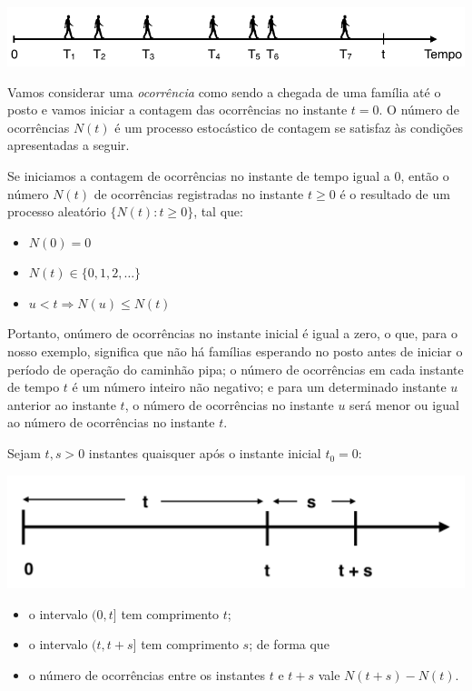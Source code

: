 \documentclass[
]{book}
\providecommand{\tightlist}{%
  \setlength{\itemsep}{0pt}\setlength{\parskip}{0pt}}
\theoremstyle{definition}
\theoremstyle{definition}
\theoremstyle{definition}
\theoremstyle{remark}
\begin{document}
\includegraphics[width=1\linewidth]{img/processo-poisson-tempo}

Vamos considerar uma \emph{ocorrência} como sendo a chegada de uma família até o posto e vamos iniciar a contagem das ocorrências no instante \(t = 0\). O número de ocorrências \(N(t)\) é um processo estocástico de contagem se satisfaz às condições apresentadas a seguir.

Se iniciamos a contagem de ocorrências no instante de tempo igual a 0, então o número \(N(t)\) de ocorrências registradas no instante \(t\geq0\) é o resultado de um processo aleatório \(\{N(t): t \geq 0\}\), tal que:

\begin{itemize}
\tightlist
\item
  \(N(0) = 0\)\\
\item
  \(N(t) \in \{0, 1, 2, \ldots\}\)\\
\item
  \(u < t \Rightarrow N(u) \leq N(t)\)
\end{itemize}

Portanto, onúmero de ocorrências no instante inicial é igual a zero, o que, para o nosso exemplo, significa que não há famílias esperando no posto antes de iniciar o período de operação do caminhão pipa; o número de ocorrências em cada instante de tempo \(t\) é um número inteiro não negativo; e para um determinado instante \(u\) anterior ao instante \(t\), o número de ocorrências no instante \(u\) será menor ou igual ao número de ocorrências no instante \(t\).

Sejam \(t, s >0\) instantes quaisquer após o instante inicial \(t_0 = 0\):

\includegraphics[width=0.6\linewidth]{img/processo-poisson-tempo-2}

\begin{itemize}
\tightlist
\item
  o intervalo \((0,t]\) tem comprimento \(t\);\\
\item
  o intervalo \((t, t+s]\) tem comprimento \(s\); de forma que\\
\item
  o número de ocorrências entre os instantes \(t\) e \(t+s\) vale \(N(t+s) - N(t)\).
\end{itemize}
\end{document}
